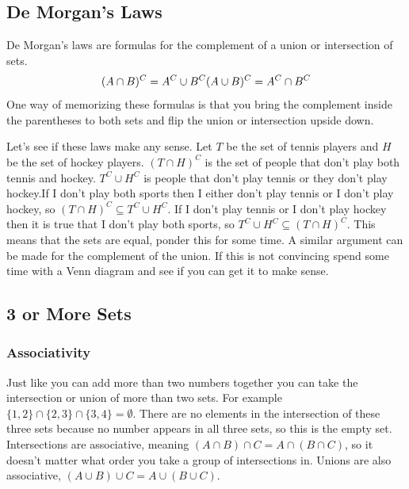 \documentclass[
]{book}
\theoremstyle{definition}
\theoremstyle{definition}
\theoremstyle{definition}
\theoremstyle{remark}
\begin{document}
\hypertarget{de-morgans-laws}{%
\subsection{De Morgan's Laws}\label{de-morgans-laws}}

De Morgan's laws are formulas for the complement of a union or intersection of sets.
\[(A \cap B)^C = A^C \cup B^C \\
 (A \cup B)^C = A^C \cap B^C\]
One way of memorizing these formulas is that you bring the complement inside the parentheses to both sets and flip the union or intersection upside down.

Let's see if these laws make any sense. Let \(T\) be the set of tennis players and \(H\) be the set of hockey players. \((T \cap H)^C\) is the set of people that don't play both tennis and hockey. \(T^C \cup H^C\) is people that don't play tennis or they don't play hockey.If I don't play both sports then I either don't play tennis or I don't play hockey, so \((T \cap H)^C \subseteq T^C \cup H^C\). If I don't play tennis or I don't play hockey then it is true that I don't play both sports, so \(T^C \cup H^C \subseteq (T \cap H)^C\). This means that the sets are equal, ponder this for some time. A similar argument can be made for the complement of the union. If this is not convincing spend some time with a Venn diagram and see if you can get it to make sense.

\hypertarget{or-more-sets}{%
\subsection{3 or More Sets}\label{or-more-sets}}

\hypertarget{associativity}{%
\subsubsection{Associativity}\label{associativity}}

Just like you can add more than two numbers together you can take the intersection or union of more than two sets. For example \(\{1,2\} \cap \{2,3\} \cap \{3,4\} = \emptyset\). There are no elements in the intersection of these three sets because no number appears in all three sets, so this is the empty set. Intersections are associative, meaning \((A \cap B) \cap C= A \cap (B \cap C)\), so it doesn't matter what order you take a group of intersections in. Unions are also associative, \((A \cup B) \cup C= A \cup (B \cup C)\).
\end{document}
